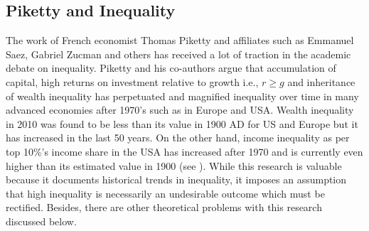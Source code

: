 \documentclass[12pt]{article}
\newcommand{\1}{\mathbbm 1}
\begin{document}
	    
	    
	   
	    
	   
	    
	    
	    
		
		
		
		\subsection{Piketty and Inequality} 
		
		
		The work of French economist Thomas Piketty \cite{piketty2017capital} and affiliates such as Emmanuel Saez, Gabriel Zucman and others has received a lot of traction in the academic debate on inequality. Piketty and his co-authors argue that accumulation of capital, high returns on investment relative to growth i.e., $r \geq g$ and inheritance of wealth inequality has perpetuated and magnified inequality over time in many advanced economies after 1970's such as in Europe and USA. Wealth inequality in 2010 was found to be less than its value in 1900 AD for US and Europe but it has increased in the last 50 years. On the other hand, income inequality as per top 10\%'s income share in the USA has increased after 1970 and is currently even higher than its estimated value in 1900 (see \cite{chancel2022world}). While this research is valuable because it documents historical trends in inequality, it imposes an assumption that high inequality is necessarily an undesirable outcome which must be rectified. Besides, there are other theoretical problems with this research discussed below. 
		
\end{document}
